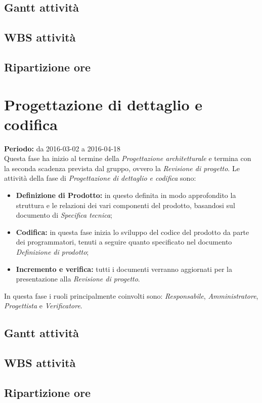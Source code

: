 \documentclass[a4paper]{report}
\begin{document}
			\subsection{Gantt attività}
			\subsection{WBS attività}
			\subsection{Ripartizione ore}
		\section{Progettazione di dettaglio e codifica}
			\textbf{Periodo:} da 2016-03-02 a 2016-04-18 \\
			Questa fase ha inizio al termine della \emph{Progettazione architetturale} e termina con la seconda scadenza 
			prevista dal gruppo, ovvero la \emph{Revisione di progetto}. Le attività della fase di \emph{Progettazione di 
			dettaglio e codifica} sono:
			\begin{itemize}
				\item \textbf{Definizione di Prodotto:} in questo definita in modo approfondito la struttura e le relazioni 
				dei vari componenti del prodotto, basandosi sul documento di \emph{Specifica tecnica}; 
				\item \textbf{Codifica:} in questa fase inizia lo sviluppo del codice del prodotto da parte dei programmatori, 
				tenuti a seguire quanto specificato nel documento \emph{Definizione di prodotto};
				\item \textbf{Incremento e verifica:} tutti i documenti verranno aggiornati per la presentazione alla 
				\emph{Revisione di progetto}.
			\end{itemize}
			In questa fase i ruoli principalmente coinvolti sono: \emph{Responsabile}, \emph{Amministratore},
			\emph{Progettista} e \emph{Verificatore}.

			\subsection{Gantt attività}
			\subsection{WBS attività}
			\subsection{Ripartizione ore}
\end{document}
